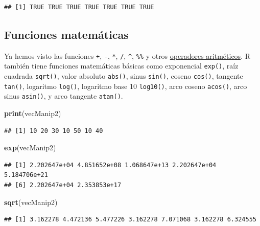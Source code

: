 \documentclass[
]{book}
\newenvironment{Shaded}{\begin{snugshade}}{\end{snugshade}}
\newcommand{\KeywordTok}[1]{\textcolor[rgb]{0.13,0.29,0.53}{\textbf{#1}}}
\newcommand{\NormalTok}[1]{#1}
\begin{document}
\begin{verbatim}
## [1] TRUE TRUE TRUE TRUE TRUE TRUE TRUE
\end{verbatim}

\hypertarget{l015maths}{%
\subsection{Funciones matemáticas}\label{l015maths}}

Ya hemos visto las funciones \texttt{+}, \texttt{-}, \texttt{*}, \texttt{/}, \texttt{\^{}}, \texttt{\%\%} y otros \protect\hyperlink{l011opari}{operadores aritméticos}. R también tiene funciones matemáticas básicas como exponencial \texttt{exp()}, raíz cuadrada \texttt{sqrt()}, valor absoluto \texttt{abs()}, sinus \texttt{sin()}, coseno \texttt{cos()}, tangente \texttt{tan()}, logaritmo \texttt{log()}, logaritmo base 10 \texttt{log10()}, arco coseno \texttt{acos()}, arco sinus \texttt{asin()}, y arco tangente \texttt{atan()}.

\begin{Shaded}
\begin{Highlighting}[]
\KeywordTok{print}\NormalTok{(vecManip2)}
\end{Highlighting}
\end{Shaded}

\begin{verbatim}
## [1] 10 20 30 10 50 10 40
\end{verbatim}

\begin{Shaded}
\begin{Highlighting}[]
\KeywordTok{exp}\NormalTok{(vecManip2)}
\end{Highlighting}
\end{Shaded}

\begin{verbatim}
## [1] 2.202647e+04 4.851652e+08 1.068647e+13 2.202647e+04 5.184706e+21
## [6] 2.202647e+04 2.353853e+17
\end{verbatim}

\begin{Shaded}
\begin{Highlighting}[]
\KeywordTok{sqrt}\NormalTok{(vecManip2)}
\end{Highlighting}
\end{Shaded}

\begin{verbatim}
## [1] 3.162278 4.472136 5.477226 3.162278 7.071068 3.162278 6.324555
\end{verbatim}
\end{document}
